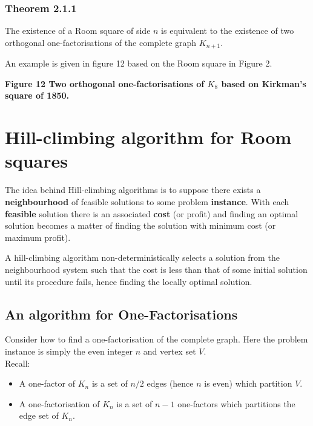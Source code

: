 \documentclass[
  12pt,
  a4paper]{book}
\begin{document}
\hypertarget{theorem-2.1.1}{%
\subsubsection{Theorem 2.1.1}\label{theorem-2.1.1}}

The existence of a Room square of side \(n\) is equivalent to the
existence of two orthogonal one-factorisations of the complete graph
\(K_{n+1}\).

An example is given in figure 12 based on the Room square in Figure 2.

\textbf{Figure 12 Two orthogonal one-factorisations of \(K_8\) based on
Kirkman's square of 1850.}

\hypertarget{hill-climbing-algorithm-for-room-squares}{%
\section{Hill-climbing algorithm for Room
squares}\label{hill-climbing-algorithm-for-room-squares}}

The idea behind Hill-climbing algorithms is to suppose there exists a
\textbf{neighbourhood} of feasible solutions to some problem
\textbf{instance}. With each \textbf{feasible} solution there is an
associated \textbf{cost} (or profit) and finding an optimal solution
becomes a matter of finding the solution with minimum cost (or maximum
profit).

A hill-climbing algorithm non-deterministically selects a solution from
the neighbourhood system such that the cost is less than that of some
initial solution until its procedure fails, hence finding the locally
optimal solution.

\hypertarget{an-algorithm-for-one-factorisations}{%
\subsection{An algorithm for
One-Factorisations}\label{an-algorithm-for-one-factorisations}}

Consider how to find a one-factorisation of the complete graph. Here the
problem instance is simply the even integer \(n\) and vertex set
\(V\).\\
Recall:

\begin{itemize}
\item
  A one-factor of \(K_n\) is a set of \(n/2\) edges (hence \(n\) is
  even) which partition \(V\).
\item
  A one-factorisation of \(K_n\) is a set of \(n-1\) one-factors which
  partitions the edge set of \(K_n\).
\end{itemize}
\end{document}
